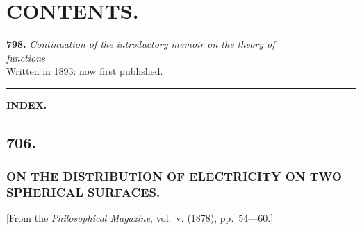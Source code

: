 \documentclass[11pt,a4paper]{book}
\begin{document}
\cleardoublepage

\chapter*{CONTENTS.}

\textbf{798.} \textit{Continuation of the introductory memoir on the theory of}\\
\hspace*{2em}\textit{functions} \\
\hspace*{2em}Written in 1893: now first published.

\vspace{2em}
\begin{center}
\rule{0.5\textwidth}{0.4pt}
\end{center}

\textbf{INDEX.} 

\cleardoublepage

\thispagestyle{empty}
\vspace*{\fill}
\cleardoublepage

\mainmatter

\section*{706.}
\subsection*{ON THE DISTRIBUTION OF ELECTRICITY ON TWO SPHERICAL SURFACES.}

\begin{center}
[From the \textit{Philosophical Magazine}, vol.~v. (1878), pp.~54---60.]
\end{center}
\medskip
\end{document}
